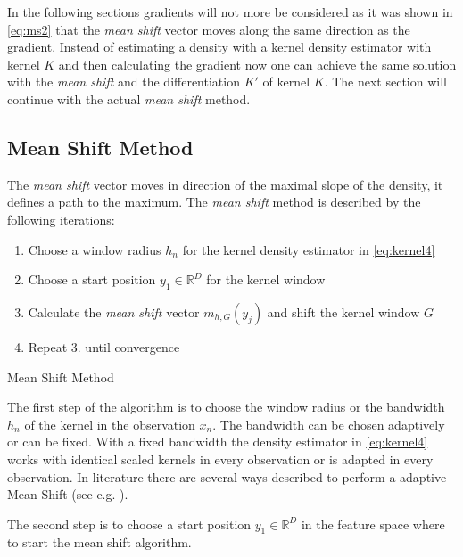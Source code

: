 In the following sections gradients will not more be considered as it was shown
in \autoref{eq:ms2} that the \emph{mean shift} vector moves along the same
direction as the gradient. Instead of estimating a density with a kernel 
density estimator with kernel $K$ and then calculating the gradient now one can
achieve the same solution with the \emph{mean shift} and the differentiation
$K'$ of kernel $K$. The next section will continue with the actual \emph{mean shift}
method.

\subsection{Mean Shift Method} 
\label{sec:mean_shift_method}

The \emph{mean shift} vector moves in direction of the maximal slope of the
density, it defines a path to the maximum. The \emph{mean shift}
method is described by the following iterations:

\begin{algorithm2e}[H]

\begin{enumerate}%
	\item Choose a window radius $h_n$ for the kernel density estimator in \autoref{eq:kernel4}
  	\item Choose a start position $y_1 \in \mathbb{R}^D$ for the kernel window
   	\item Calculate the \emph{mean shift} vector $m_{h,G}(y_j)$ and shift the kernel window $G$
	\item Repeat 3. until convergence
\end{enumerate}

\caption{Mean Shift Method}
\label{alg:ms}
\end{algorithm2e}

The first step of the algorithm is to choose the window radius or the bandwidth
$h_n$ of the kernel in the observation $x_n$. The bandwidth can be chosen
adaptively or can be fixed. With a fixed bandwidth the density estimator in
\autoref{eq:kernel4} works with identical scaled kernels in every observation or
is adapted in every observation. In literature there are several ways described
to perform a adaptive Mean Shift (see e.g. \citeauthor{citeulike:4910570}
\citep{citeulike:4910570}).

The second step is to choose a start position $y_1 \in \mathbb{R}^D$ in the 
feature space where to start the mean shift algorithm.

